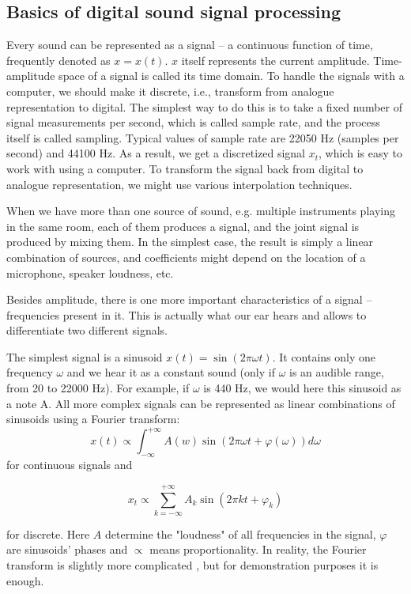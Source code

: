 \documentclass[../main.tex]{subfiles} %
\begin{document}
\subsection{Basics of digital sound signal processing}

Every sound can be represented as a signal -- a continuous function of time, frequently denoted as $x = x(t)$. $x$ itself represents the current amplitude. Time-amplitude space of a signal is called its time domain.
To handle the signals with a computer, we should make it discrete, i.e., transform from analogue representation to digital. The simplest way to do this is to take a fixed number of signal measurements per second, which is called sample rate, and the process itself is called sampling. 
Typical values of sample rate are 22050 Hz (samples per second) and 44100 Hz. 
As a result, we get a discretized signal $x_t$, which is easy to work with using a computer. 
To transform the signal back from digital to analogue representation, we might use various interpolation techniques.

When we have more than one source of sound, e.g. multiple instruments playing in the same room, each of them produces a signal, and the joint signal is produced by mixing them. 
In the simplest case, the result is simply a linear combination of sources, and coefficients might depend on the location of a microphone, speaker loudness, etc.


Besides amplitude, there is one more important characteristics of a signal -- frequencies present in it. 
This is actually what our ear hears and allows to differentiate two different signals.

The simplest signal is a sinusoid $x(t) = \sin(2\pi \omega t)$. 
It contains only one frequency $\omega$ and we hear it as a constant sound (only if $\omega$ is an audible range, from 20 to 22000 Hz).
For example, if $\omega$ is 440 Hz, we would here this sinusoid as a note A.
All more complex signals can be represented as linear combinations of sinusoids using a Fourier transform: 
\[ x(t) \propto \int_{-\infty}^{+\infty} A(w) \sin(2\pi \omega t + \varphi(\omega)) d \omega \]
for continuous signals and 

\[x_t \propto \sum_{k=-\infty}^{+\infty} A_k \sin(2 \pi k t + \varphi_k)\]

for discrete. 
Here $A$ determine the "loudness" of all frequencies in the signal, $\varphi$ are sinusoids' phases and $\propto$ means proportionality. 
In reality, the Fourier transform is slightly more complicated \cite{ft,dft}, but for demonstration purposes it is enough.
\end{document}
